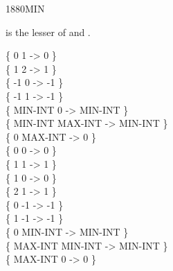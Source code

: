 \begin{worddef}{1880}{MIN}
\item {}

	 is the lesser of  and .

	\begin{defer}
	\testing
		\{       0       1  ->       0 \} \\
		\{       1       2  ->       1 \} \\
		\{      -1       0  ->      -1 \} \\
		\{      -1       1  ->      -1 \} \\
		\{ MIN-INT       0  -> MIN-INT \} \\
		\{ MIN-INT MAX-INT  -> MIN-INT \} \\
		\{       0 MAX-INT  ->       0 \} \\
		\{       0       0  ->       0 \} \\
		\{       1       1  ->       1 \} \\
		\{       1       0  ->       0 \} \\
		\{       2       1  ->       1 \} \\
		\{       0      -1  ->      -1 \} \\
		\{       1      -1  ->      -1 \} \\
		\{       0 MIN-INT  -> MIN-INT \} \\
		\{ MAX-INT MIN-INT  -> MIN-INT \} \\
		\{ MAX-INT       0  ->       0 \} \\
	\end{defer}
\end{worddef}


